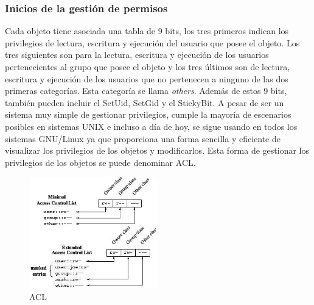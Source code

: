 \documentclass[titlepage, 12pt, a4paper]{article}
\begin{document}
\subsubsection{Inicios de la gestión de permisos}
Cada objeto tiene asociada una tabla de 9 bits, los tres primeros indican los privilegios de lectura, escritura y ejecución del usuario que posee el objeto. Los tres siguientes son para la lectura, escritura y ejecución de los usuarios pertenecientes al grupo que posee el objeto y los tres últimos son de lectura, escritura y ejecución de los usuarios que no pertenecen a ninguno de las dos primeras categorías. Esta categoría se llama \textit{others}. Además de estos 9 bits, también pueden incluir el \Gls{SetUid}, \Gls{SetGid} y el \Gls{StickyBit}. A pesar de ser un sistema muy simple de gestionar privilegios, cumple la mayoría de escenarios posibles en sistemas UNIX e incluso a día de hoy, se sigue usando en todos los sistemas \Gls{GNU/Linux} ya que proporciona una forma sencilla y eficiente de visualizar los privilegios de los objetos y modificarlos. Esta forma de gestionar los privilegios de los objetos se puede denominar \Gls{ACL}.
\begin{figure}[H]
    \centering
    \includegraphics[width=0.5\textwidth]{Media/ACL.jpg}
    \caption{\Gls{ACL}}
    \label{fig:ACL}
\end{figure}
\end{document}
